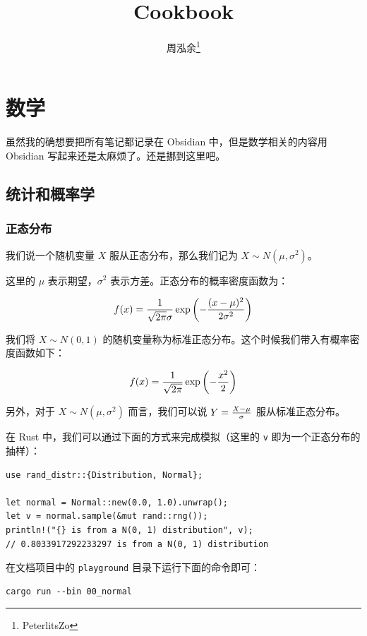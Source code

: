 \documentclass[utf8,a4paper,nofonts]{ctexbook}
\title{Cookbook}
\author{周泓余\thanks{PeterlitsZo}}
\begin{document}
\maketitle

\tableofcontents
\newpage

\chapter{数学}

虽然我的确想要把所有笔记都记录在 Obsidian 中，但是数学相关的内容用 Obsidian 写起来还是太麻烦了。还是挪到这里吧。

\section{统计和概率学}

\subsection{正态分布}

我们说一个随机变量 $X$ 服从正态分布，那么我们记为 $X \sim N(\mu, \sigma^2)$。

这里的 $\mu$ 表示期望，$\sigma^2$ 表示方差。正态分布的概率密度函数为：

$$
f(x) = {1 \over \sqrt{2\pi}\sigma} \exp\left(-{(x - \mu)^2 \over 2\sigma^2}\right)
$$

我们将 $X \sim N(0, 1)$ 的随机变量称为标准正态分布。这个时候我们带入有概率密度函数如下：

$$
f(x) = {1 \over \sqrt{2\pi}} \exp\left(-{x^2 \over 2}\right)
$$

另外，对于 $X \sim N(\mu, \sigma^2)$ 而言，我们可以说 $Y = {X - \mu \over \sigma}$ 服从标准正态分布。

在 Rust 中，我们可以通过下面的方式来完成模拟（这里的 \verb|v| 即为一个正态分布的抽样）：

\begin{lstlisting}
use rand_distr::{Distribution, Normal};

let normal = Normal::new(0.0, 1.0).unwrap();
let v = normal.sample(&mut rand::rng());
println!("{} is from a N(0, 1) distribution", v);
// 0.8033917292233297 is from a N(0, 1) distribution
\end{lstlisting}

在文档项目中的 \verb|playground| 目录下运行下面的命令即可：

\begin{lstlisting}
cargo run --bin 00_normal
\end{lstlisting}
\end{document}
